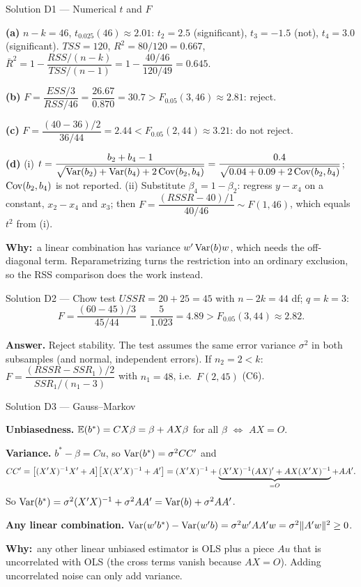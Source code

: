 \documentclass[11pt]{article}
\newcommand{\step}[1]{\par\smallskip\noindent\textbf{\textcolor{qnavy}{#1}}\quad\ignorespaces}
\newcommand{\Why}{\textbf{\textcolor{whyline}{Why:}}\ }
\newcommand{\Ans}[1]{\par\smallskip\noindent\colorbox{qlight}{\parbox{\dimexpr\linewidth-2\fboxsep}{\textbf{Answer.} #1}}\par}
\begin{document}
\begin{solbox}{Solution D1 --- Numerical $t$ and $F$}
\step{(a)} $n - k = 46$, $t_{0.025}(46) \approx 2.01$: $t_{2} = 2.5$ (significant), $t_{3} = -1.5$ (not),
$t_{4} = 3.0$ (significant). $TSS = 120$, $R^{2} = 80/120 = 0.667$,
$\bar R^{2} = 1 - \dfrac{RSS/(n-k)}{TSS/(n-1)} = 1 - \dfrac{40/46}{120/49} = 0.645$.
\step{(b)} $F = \dfrac{ESS/3}{RSS/46} = \dfrac{26.67}{0.870} = 30.7 > F_{0.05}(3,46) \approx 2.81$: reject.
\step{(c)} $F = \dfrac{(40 - 36)/2}{36/44} = 2.44 < F_{0.05}(2,44) \approx 3.21$: do not reject.
\step{(d)} (i) $t = \dfrac{b_{2} + b_{4} - 1}{\sqrt{\operatorname{Var}(b_{2}) + \operatorname{Var}(b_{4}) + 2\operatorname{Cov}(b_{2},b_{4})}}
= \dfrac{0.4}{\sqrt{0.04 + 0.09 + 2\operatorname{Cov}(b_{2},b_{4})}}$; $\operatorname{Cov}(b_{2},b_{4})$ is not reported.
(ii) Substitute $\beta_{4} = 1 - \beta_{2}$: regress $y - x_{4}$ on a constant, $x_{2} - x_{4}$
and $x_{3}$; then $F = \dfrac{(RSSR - 40)/1}{40/46} \sim F(1,46)$, which equals $t^{2}$ from (i).
\begin{why}\Why a linear combination has variance $w^{\prime}\operatorname{Var}(b)w$, which needs the
off-diagonal term. Reparametrizing turns the restriction into an ordinary exclusion,
so the RSS comparison does the work instead.\end{why}
\end{solbox}

\begin{solbox}{Solution D2 --- Chow test}
$USSR = 20 + 25 = 45$ with $n - 2k = 44$ df; $q = k = 3$:
\[
  F = \frac{(60 - 45)/3}{45/44} = \frac{5}{1.023} = 4.89 > F_{0.05}(3,44) \approx 2.82 .
\]
\Ans{Reject stability. The test assumes the same error variance $\sigma^{2}$ in both subsamples
(and normal, independent errors). If $n_{2} = 2 < k$: $F = \dfrac{(RSSR - SSR_{1})/2}{SSR_{1}/(n_{1}-3)}$
with $n_{1} = 48$, i.e.\ $F(2, 45)$ (C6).}
\end{solbox}

\begin{solbox}{Solution D3 --- Gauss--Markov}
\step{Unbiasedness.} $\mathbb{E}(b^{*}) = CX\beta = \beta + AX\beta$ for all $\beta$ $\iff$ $AX = O$.
\step{Variance.} $b^{*} - \beta = Cu$, so $\operatorname{Var}(b^{*}) = \sigma^{2}CC^{\prime}$ and
\[
  CC^{\prime} = \big[(X^{\prime} X)^{-1}X^{\prime} + A\big]\big[X(X^{\prime} X)^{-1} + A^{\prime}\big]
  = (X^{\prime} X)^{-1} + \underbrace{(X^{\prime} X)^{-1}(AX)^{\prime} + AX(X^{\prime} X)^{-1}}_{=O} + AA^{\prime} .
\]
So $\operatorname{Var}(b^{*}) = \sigma^{2}(X^{\prime} X)^{-1} + \sigma^{2}AA^{\prime} = \operatorname{Var}(b) + \sigma^{2}AA^{\prime}$.
\step{Any linear combination.} $\operatorname{Var}(w^{\prime} b^{*}) - \operatorname{Var}(w^{\prime} b) = \sigma^{2}w^{\prime} AA^{\prime} w
= \sigma^{2}\|A^{\prime} w\|^{2} \ge 0$.
\begin{why}\Why any other linear unbiased estimator is OLS plus a piece $Au$ that is
uncorrelated with OLS (the cross terms vanish because $AX = O$). Adding uncorrelated
noise can only add variance.\end{why}
\end{solbox}
\end{document}
